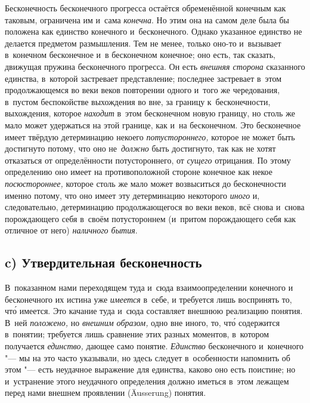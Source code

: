 Бесконечность бесконечного прогресса остаётся обременённой конечным как
таковым, ограничена им и~сама {\em конечна}. Но этим
она на самом деле была бы положена как единство конечного и~бесконечного.
Однако указанное единство не делается предметом размышления. Тем не менее,
только оно-то и~вызывает в~конечном бесконечное и~в бесконечном конечное;
оно есть, так сказать, движущая пружина бесконечного прогресса. Он есть
{\em внешняя сторона} сказанного единства, в~которой
застревает представление; последнее застревает в~этом продолжающемся во
веки веков повторении одного и~того же чередования, в~пустом беспокойстве
выхождения во вне, за границу к~бесконечности, выхождения, которое
{\em находит} в~этом бесконечном новую границу, но
столь же мало может удержаться на этой границе, как и~на бесконечном. Это
бесконечное имеет твёрдую детерминацию некоего
{\em потустороннего,} которое не может быть достигнуто
потому, что оно не~{\em должно} быть достигнуто, так
как не хотят отказаться от определённости потустороннего, от
{\em сущего} отрицания. По этому определению оно имеет
на противоположной стороне конечное как некое
{\em посюстороннее,} которое столь же мало может
возвыситься до бесконечности именно потому, что оно имеет эту детерминацию
некоторого {\em иного} и, следовательно, детерминацию
продолжающегося во веки веков, всё снова и~снова порождающего себя в~своём
потустороннем (и~притом порождающего себя как отличное от него)
{\em наличного бытия}.

\subsection[c) Утвердительная бесконечность]{c) Утвердительная бесконечность}

В~показанном нами переходящем туда и~сюда взаимоопределении конечного и
бесконечного их истина уже {\em имеется} в~себе, и
требуется лишь воспринять то, чт\'{о} имеется. Это качание туда и~сюда
составляет внешнюю реализацию понятия. В~ней
{\em положено,} но {\em внешним
образом,} одно вне иного, то, чт\'{о} содержится в~понятии; требуется лишь
сравнение этих разных моментов, в~котором получается
{\em единство,} дающее само понятие.
{\em Единство} бесконечного и~конечного "--- мы на это
часто указывали, но здесь следует в~особенности напомнить об этом "--- есть
неудачное выражение для единства, каково оно есть поистине; но и~устранение
этого неудачного определения должно иметься в~этом лежащем перед нами
внешнем проявлении (Äusserung) понятия.

